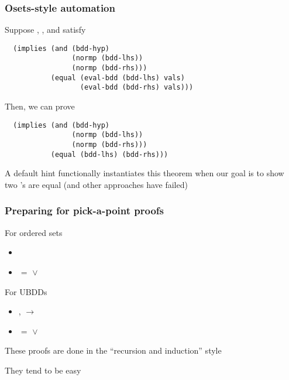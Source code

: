 \begin{frame}[fragile]
\frametitle{Osets-style automation}

Suppose , , and  satisfy
\begin{verbatim}
  (implies (and (bdd-hyp)
                (normp (bdd-lhs))
                (normp (bdd-rhs)))
           (equal (eval-bdd (bdd-lhs) vals) 
                  (eval-bdd (bdd-rhs) vals)))
\end{verbatim}

\SmallSkip
Then, we can prove
\begin{verbatim}
  (implies (and (bdd-hyp) 
                (normp (bdd-lhs))
                (normp (bdd-rhs)))
           (equal (bdd-lhs) (bdd-rhs)))
\end{verbatim}

\SmallSkip
A default hint functionally instantiates this theorem when our goal is to show
two 's are equal (and other approaches have failed)
\end{frame}


\begin{frame}[fragile]
\frametitle{Preparing for pick-a-point proofs}

For ordered sets
\begin{itemize}
\item {}
\item {} $=$  $\vee$ 
\end{itemize}

\SmallSkip

For UBDDs
\begin{itemize}
\item {},  $\rightarrow$ 
\item {} $=$  $\vee$ 
\end{itemize}

\SmallSkip
These proofs are done in the ``recursion and induction'' style

They tend to be easy

\end{frame}



